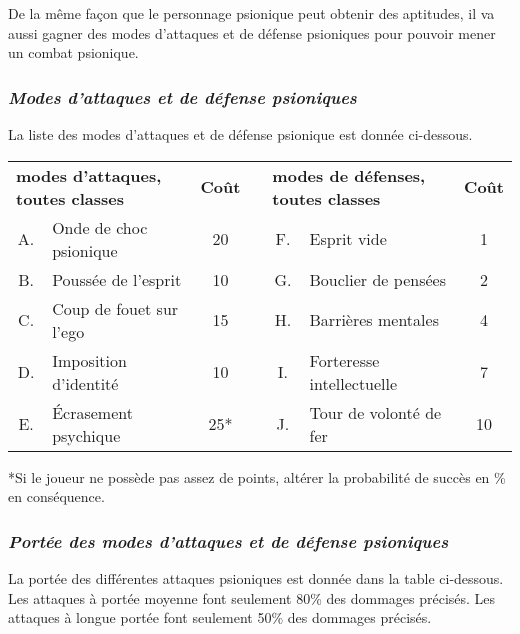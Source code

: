 \bigskip

De la même façon que le personnage psionique peut obtenir des aptitudes, il va aussi gagner des modes d'attaques et de défense psioniques pour pouvoir mener un combat psionique.

\subsubsection*{\textit{Modes d'attaques et de défense psioniques}}
\label{custom-attaques}

La liste des modes d'attaques et de défense psionique est donnée ci-dessous.

\bigskip

\begin{tabular}{clccclc}
\multicolumn{2}{l}{\textbf{modes d'attaques, toutes classes}} & \textbf{Coût} && \multicolumn{2}{l}{\textbf{modes de défenses, toutes classes}} & \textbf{Coût} \\
A. & Onde de choc psionique   & 20  && F. & Esprit vide  & 1 \\
B. & Poussée de l'esprit  	  & 10  && G. & Bouclier de pensées  & 2 \\
C. & Coup de fouet sur l'ego  & 15  && H. & Barrières mentales & 4 \\
D. & Imposition d'identité    & 10  && I. & Forteresse intellectuelle  & 7 \\
E. & Écrasement psychique     & 25* && J. & Tour de volonté de fer  & 10 \\
\end{tabular}

\bigskip

*Si le joueur ne possède pas assez de points, altérer la probabilité de succès en \% en conséquence.

\subsubsection*{\textit{Portée des modes d'attaques et de défense psioniques}}

La portée des différentes attaques psioniques est donnée dans la table ci-dessous. Les attaques à portée moyenne font seulement 80\% des dommages précisés. Les attaques à longue portée font seulement 50\% des dommages précisés.


